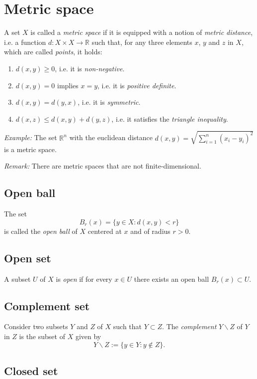 \documentclass[aps,prl,twocolumn,groupedaddress]{revtex4-2}
\newcommand{\RR}{\mathbb{R}}
\begin{document}
\section{Metric space}

A set $X$ is called a {\em metric space} if it is equipped with a notion of {\em metric distance}, i.e. a function $d:X\times X\to \RR$ such that, for any three elements $x$, $y$ and $z$ in $X$, which are called {\em points}, it holds:
\begin{enumerate}
\item $d(x,y) \geq 0$, i.e. it is {\em non-negative}.
\item $d(x,y) = 0$ implies $x=y$, i.e. it is {\em positive definite}.
\item $d(x,y) = d(y,x)$, i.e. it is {\em symmetric}.
\item $d(x,z) \leq  d(x,y) + d(y,z)$, i.e. it satisfies the {\em triangle inequality}.
\end{enumerate}

{\em Example:} The set $\RR^n$ with the euclidean distance $d(x,y) = \sqrt{\sum_{i=1}^n (x_i-y_i)^2}$ is a metric space.

{\em Remark:} There are metric spaces that are not finite-dimensional.

\subsection{Open ball}

The set
$$
B_r(x)
=
\{y\in X: d(x,y)<r\}
$$
is called the {\em open ball} of $X$ centered at $x$ and of radius $r>0$.

\subsection{Open set}

A subset $U$ of $X$ is {\em open} if for every $x\in U$ there exists an open ball $B_r(x) \subset U$.

\subsection{Complement set}

Consider two subsets $Y$ and $Z$ of $X$ such that $Y\subset Z$.
The {\em complement} $Y\backslash Z$ of $Y$ in $Z$ is the subset of $X$ given by
$$
Y\backslash Z := \{y\in Y:y\notin Z\}.
$$

\subsection{Closed set}
\end{document}
